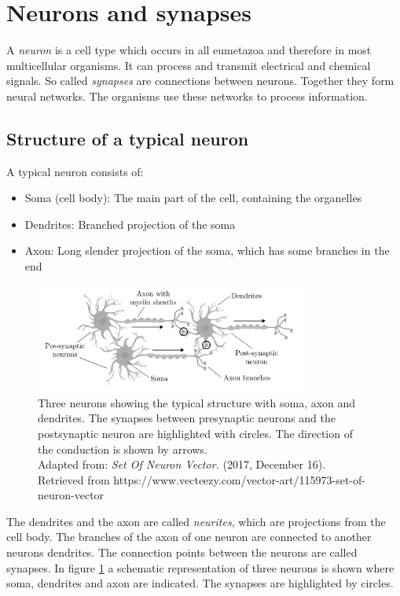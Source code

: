 \section{Neurons and synapses}
\label{seq:ns}

A \emph{neuron} is a cell type which occurs in all eumetazoa and therefore in most multicellular organisms. It can process and transmit electrical and chemical signals. So called \emph{synapses} are connections between neurons. Together they form neural networks. The organisms use these networks to process information.

\subsection{Structure of a typical neuron}

A typical neuron consists of:

\begin{itemize}
\item Soma (cell body): The main part of the cell, containing the organelles
\item Dendrites: Branched projection of the soma
\item Axon: Long slender projection of the soma, which has some branches in the end
\end{itemize}

\begin{figure}[!b]
	\centering
	\includegraphics[width=0.8\textwidth]{neurons_plasticity/neurons}
	\caption[Structure of a typical neuron]{Three neurons showing the typical structure with soma, axon and dendrites. The synapses between presynaptic neurons and the postsynaptic neuron are highlighted with circles. The direction of the conduction is shown by arrows.\\ Adapted from: \emph{Set Of Neuron Vector.} (2017, December 16). Retrieved from https://www.vecteezy.com/vector-art/115973-set-of-neuron-vector}
	\label{fig:neurons}
\end{figure}

The dendrites and  the axon are called \emph{neurites}, which are projections from the cell body. The branches of the axon of one neuron are connected to another neurons dendrites. The connection points between the neurons are called synapses. In figure \ref{fig:neurons} a schematic representation of three neurons is shown where soma, dendrites and axon are indicated. The synapses are highlighted by circles.

